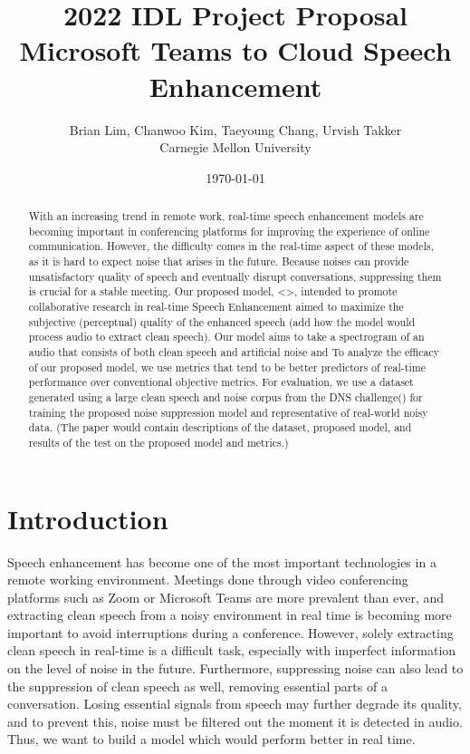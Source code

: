 \documentclass[11pt]{article}
\title{2022 IDL Project Proposal \\ \vspace{0.5cm} \large \textbf{Microsoft Teams to Cloud Speech Enhancement}}
\author{Brian Lim, Chanwoo Kim, Taeyoung Chang, Urvish Takker \\ Carnegie Mellon University}
\date{\today}
\date{}
\begin{document}

\maketitle

\begin{abstract}
    With an increasing trend in remote work, real-time speech enhancement models are becoming important in conferencing platforms for improving the experience of online communication. However, the difficulty comes in the real-time aspect of these models, as it is hard to expect noise that arises in the future. Because noises can provide unsatisfactory quality of speech and eventually disrupt conversations, suppressing them is crucial for a stable meeting. Our proposed model, <>, intended to promote collaborative research in real-time Speech Enhancement aimed to maximize the subjective (perceptual) quality of the enhanced speech (add how the model would process audio to extract clean speech). Our model aims to take a spectrogram of an audio that consists of both clean speech and artificial noise and To analyze the efficacy of our proposed model, we use metrics that tend to be better predictors of real-time performance over conventional objective metrics. For evaluation, we use a dataset generated using a large clean speech and noise corpus from the DNS challenge(\cite{DNSchallenge2020}) for training the proposed noise suppression model and representative of real-world noisy data. (The paper would contain descriptions of the dataset, proposed model, and results of the test on the proposed model and metrics.)
\end{abstract}


\section{Introduction}
Speech enhancement has become one of the most important technologies in a remote working environment.  Meetings done through video conferencing platforms such as Zoom or Microsoft Teams are more prevalent than ever, and extracting clean speech from a noisy environment in real time is becoming more important to avoid interruptions during a conference. However, solely extracting clean speech in real-time is a difficult task, especially with imperfect information on the level of noise in the future. Furthermore, suppressing noise can also lead to the suppression of clean speech as well, removing essential parts of a conversation. Losing essential signals from speech may further degrade its quality, and to prevent this, noise must be filtered out the moment it is detected in audio. Thus, we want to build a model which would perform better in real time. 
\end{document}
